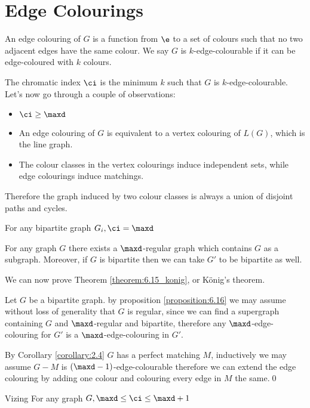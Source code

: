 \section{Edge Colourings}
An edge colouring of $G$ is a function from $\e$ to a set of colours such that no two adjacent edges have the same colour. We say $G$ is $k$-edge-colourable if it can be edge-coloured with $k$ colours.

The chromatic index $\ci$ is the minimum $k$ such that $G$ is $k$-edge-colourable. Let's now go through a couple of observations:
\begin{itemize}
    \item $\ci \geq \maxd$
    \item An edge colouring of $G$ is equivalent to a vertex colouring of $L(G)$, which is the line graph.
    \item The colour classes in the vertex colourings induce independent sets, while edge colourings induce matchings.
\end{itemize}
Therefore the graph induced by two colour classes is always a union of disjoint paths and cycles.
\begin{customtheorem}{6.15}
\label{theorem:6.15_konig}
    For any bipartite graph $G_i, \ci = \maxd$    
\end{customtheorem}
\begin{customproposition}{6.16}
\label{proposition:6.16}
    For any graph $G$ there exists a $\maxd$-regular graph which contains $G$ as a subgraph. Moreover, if $G$ is bipartite then we can take $G'$ to be bipartite as well.
\end{customproposition}
We can now prove Theorem \ref{theorem:6.15_konig}, or König's theorem.
\begin{prf}
    Let $G$ be a bipartite graph. by proposition \ref{proposition:6.16} we may assume without loss of generality that $G$ is regular, since we can find a supergraph containing $G$ and $\maxd$-regular and bipartite, therefore any $\maxd$-edge-colouring for $G'$ is a $\maxd$-edge-colouring in $G'$.

    By Corollary \ref{corollary:2.4} $G$ has a perfect matching $M$, inductively we may assume $G - M$ is $(\maxd - 1)$-edge-colourable therefore we can extend the edge colouring by adding one colour and colouring every edge in $M$ the same.\qed
\end{prf}
\begin{customtheorem}{Vizing}
\label{theorem:vizing}
    For any graph $G, \maxd \leq \ci \leq \maxd + 1$
\end{customtheorem}
